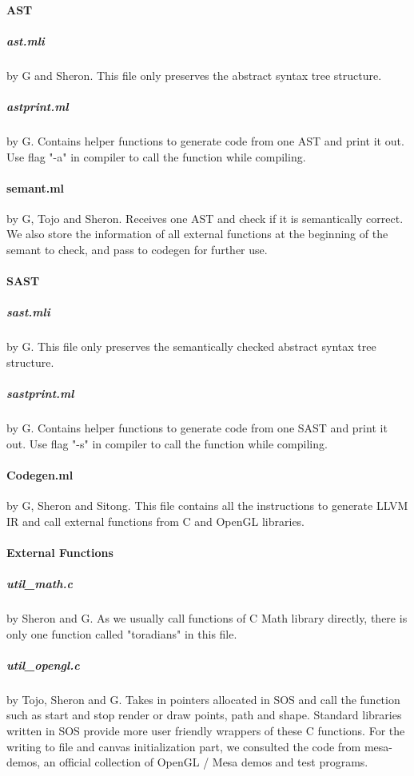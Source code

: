 \documentclass[main.tex]{subfiles}
\begin{document}
	\paragraph{AST}
	    \subparagraph{ast.mli} by G and Sheron. This file only preserves the abstract syntax tree structure.
	    \subparagraph{astprint.ml} by G. Contains helper functions to generate code from one AST and print it out. Use flag "-a" in compiler to call the function while compiling.
	    
    \paragraph{semant.ml} by G, Tojo and Sheron. Receives one AST and check if it is semantically correct. We also store the information of all external functions at the beginning of the semant to check, and pass to codegen for further use.
	
	\paragraph{SAST}
	    \subparagraph{sast.mli} by G. This file only preserves the semantically checked abstract syntax tree structure.
	    \subparagraph{sastprint.ml} by G. Contains helper functions to generate code from one SAST and print it out. Use flag "-s" in compiler to call the function while compiling.
	    
    \paragraph{Codegen.ml} by G, Sheron and Sitong. This file contains all the instructions to generate LLVM IR and call external functions from C and OpenGL libraries.
    
    \paragraph{External Functions}
        \subparagraph{util\_math.c} by Sheron and G. As we usually call functions of C Math library directly, there is only one function called "toradians" in this file.
        
        \subparagraph{util\_opengl.c} by Tojo, Sheron and G. Takes in pointers allocated in SOS and call the function such as start and stop render or draw points, path and shape. Standard libraries written in SOS provide more user friendly wrappers of these C functions. For the writing to file and canvas initialization part, we consulted the code from mesa-demos, an official collection of OpenGL / Mesa demos and test programs.
    
\end{document}
